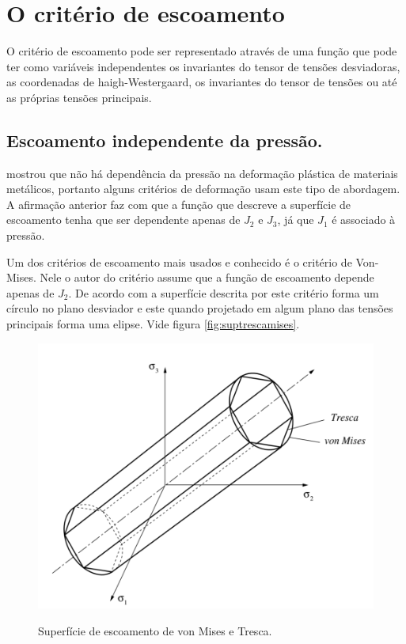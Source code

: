 \section{O critério de escoamento}

O critério de escoamento pode ser representado através de uma função que pode ter como variáveis independentes os invariantes do tensor de tensões desviadoras, as coordenadas de haigh-Westergaard, os invariantes do tensor de tensões ou até as próprias tensões principais. \\

\subsection{Escoamento independente da pressão.}

 \cite{hill} mostrou que não há dependência da pressão na deformação plástica de materiais metálicos, portanto alguns critérios de deformação usam este tipo de abordagem. A afirmação anterior faz com que a função que descreve a superfície de escoamento tenha que ser dependente apenas de $J_2$ e $J_3$, já que $J_1$ é associado à pressão.

Um dos critérios de escoamento mais usados e conhecido é o critério de Von-Mises. Nele o autor do critério assume que a função de escoamento depende apenas de $ J_2 $. De acordo com \cite{hiermaier_2008} a superfície descrita por este critério forma um círculo no plano desviador e este quando projetado em algum plano das tensões principais forma uma elipse. Vide figura \ref{fig:suptrescamises}.

\begin{figure}[H]
    \centering
    \caption{Superfície de escoamento de  von Mises e Tresca.}
    \includegraphics[width=0.7\linewidth]{images/Sup_trescaemises.png} %
    \label{fig:suptrescaemises}
\end{figure}

